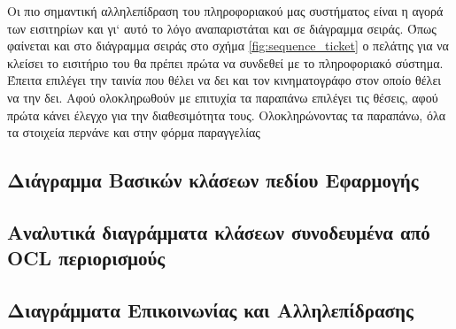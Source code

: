 \documentclass{assignment}
\begin{document}
Οι πιο σημαντική αλληλεπίδραση του πληροφοριακού μας συστήματος είναι η αγορά των εισιτηρίων και γι` αυτό το λόγο αναπαριστάται και σε διάγραμμα σειράς. Όπως φαίνεται και στο διάγραμμα σειράς στο σχήμα \ref{fig:sequence_ticket} ο πελάτης για να κλείσει το εισιτήριο του θα πρέπει πρώτα να συνδεθεί με το πληροφοριακό σύστημα. Έπειτα επιλέγει την ταινία που θέλει να δει και τον κινηματογράφο στον οποίο θέλει να την δει. Αφού ολοκληρωθούν με επιτυχία τα παραπάνω επιλέγει τις θέσεις, αφού πρώτα κάνει έλεγχο για την διαθεσιμότητα τους. Ολοκληρώνοντας τα παραπάνω, όλα τα στοιχεία περνάνε και στην φόρμα παραγγελίας 


\subsection{Διάγραμμα Βασικών κλάσεων πεδίου Εφαρμογής}



\subsection{Αναλυτικά διαγράμματα κλάσεων συνοδευμένα από OCL περιορισμούς}

\subsection{Διαγράμματα Επικοινωνίας και Αλληλεπίδρασης}




\end{document}
